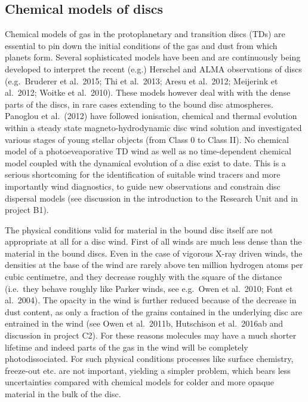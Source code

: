\documentclass[10pt,fleqn,twoside]{article}
\begin{document}
\subsection{Chemical models of discs}

Chemical models of gas in the protoplanetary and transition discs (TDs) are essential to pin down the initial conditions of the gas and dust from which planets form. Several sophisticated models have been and are continuously being developed to interpret the recent (e.g.) Herschel and ALMA observations of discs (e.g.\ Bruderer et al.\ 2015; Thi et al.\ 2013; Aresu et al.\ 2012; Meijerink et al.\ 2012; Woitke et al.\ 2010). These models however deal with with the dense parts of the discs, in rare cases extending to the bound disc atmospheres. Panoglou et al.\ (2012) have followed ionisation, chemical and thermal evolution within a steady state magneto-hydrodynamic disc wind solution and investigated various stages of young stellar objects (from Class 0 to Class II).  No chemical model of a photoeveaporative TD wind as well as no time-dependent chemical model coupled with the dynamical evolution of a disc exist to date. This is a serious shortcoming for the identification of suitable wind tracers and more importantly wind diagnostics, to guide new observations and constrain disc dispersal models (see discussion in the introduction to the Research Unit and in project B1). 

The physical conditions valid for material in the bound disc itself are not appropriate at all for a disc wind. First of all winds are much less dense than the material in the bound discs. Even in the case of vigorous X-ray driven winds, the densities at the base of the wind are rarely above ten million hydrogen atoms per cubic centimetre, and they decrease roughly with the square of the distance (i.e.\ they behave roughly like Parker winds, see e.g.\ Owen et al.\ 2010; Font et al.\ 2004). The opacity in the wind is further reduced because of the decrease in dust content, as only a fraction of the grains contained in the underlying disc are entrained in the wind (see Owen et al.\ 2011b, Hutschison et al.\ 2016ab and discussion in project C2). For these reasons molecules may have a much shorter lifetime and indeed parts of the gas in the wind will be completely photodissociated. For such physical conditions processes like surface chemistry, freeze-out etc. are not important, yielding a simpler problem, which bears less uncertainties compared with chemical models for colder and more opaque material in the bulk of the disc. 
\end{document}
